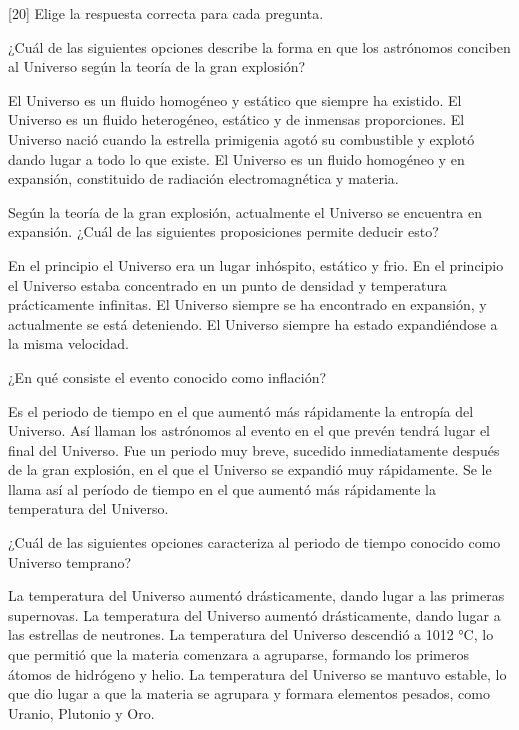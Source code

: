 [20] Elige la respuesta correcta para cada pregunta.
\begin{parts}
    ¿Cuál de las siguientes opciones describe la forma en que los astrónomos conciben al Universo según la teoría de la gran explosión?

    \begin{choices}
        \choice El Universo es un fluido homogéneo y estático que siempre ha existido.
        \choice El Universo es un fluido heterogéneo, estático y de inmensas proporciones.
        \choice El Universo nació cuando la estrella primigenia agotó su combustible y explotó dando lugar a todo lo que existe.
        \CorrectChoice El Universo es un fluido homogéneo y en expansión, constituido de radiación electromagnética y materia.
    \end{choices}

    Según la teoría de la gran explosión, actualmente el Universo se encuentra en expansión. ¿Cuál de las siguientes proposiciones permite deducir esto?

    \begin{choices}
        \choice En el principio el Universo era un lugar inhóspito, estático y frio.
        \CorrectChoice En el principio el Universo estaba concentrado en un punto de densidad y temperatura prácticamente infinitas.
        \choice El Universo siempre se ha encontrado en expansión, y actualmente se está deteniendo.
        \choice El Universo siempre ha estado expandiéndose a la misma velocidad.
    \end{choices}

    \newpage

    ¿En qué consiste el evento conocido como inflación?

    \begin{choices}
        \choice Es el periodo de tiempo en el que aumentó más rápidamente la entropía del Universo.
        \choice Así llaman los astrónomos al evento en el que prevén tendrá lugar el final del Universo.
        \CorrectChoice Fue un periodo muy breve, sucedido inmediatamente después de la gran explosión, en el que el Universo se expandió muy rápidamente.
        \choice Se le llama así al per\'iodo de tiempo en el que aumentó más rápidamente la temperatura del Universo.
    \end{choices}

    ¿Cuál de las siguientes opciones caracteriza al periodo de tiempo conocido como Universo temprano?

    \begin{choices}
        \choice La temperatura del Universo aumentó drásticamente, dando lugar a las primeras supernovas.
        \CorrectChoice La temperatura del Universo aumentó drásticamente, dando lugar a las estrellas de neutrones.
        \choice La temperatura del Universo descendió a 1012 °C, lo que permitió que la materia comenzara a agruparse, formando los primeros átomos de hidrógeno y helio.
        \choice La temperatura del Universo se mantuvo estable, lo que dio lugar a que la materia se agrupara y formara elementos pesados, como Uranio, Plutonio y Oro.
    \end{choices}


\end{parts}
